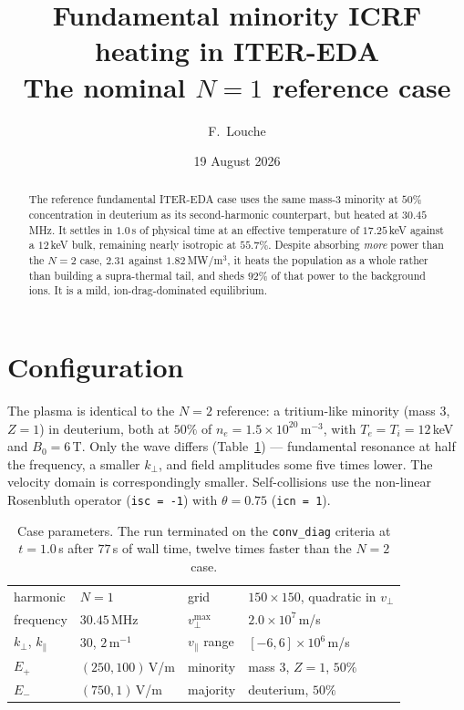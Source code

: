 \documentclass[11pt,a4paper]{article}
\title{\vspace{-1.2cm}\textbf{\large Fundamental minority ICRF heating in ITER-EDA}\\[1mm]
\normalsize The nominal $N{=}1$ reference case}
\author{\normalsize F.~Louche}
\date{\normalsize 19 August 2026}
\newcommand{\code}[1]{\texttt{\small #1}}
\newcommand{\vperp}{v_\perp}
\newcommand{\vpar}{v_\parallel}
\begin{document}
\maketitle
\vspace{-0.9cm}

\begin{abstract}
\noindent\small
The reference fundamental ITER-EDA case uses the same mass-3 minority at $50\%$
concentration in deuterium as its second-harmonic counterpart, but heated at
$30.45\,$MHz. It settles in $1.0\,$s of physical time at an effective
temperature of $17.25\,$keV against a $12\,$keV bulk, remaining nearly
isotropic at $55.7\%$. Despite absorbing \emph{more} power than the $N{=}2$
case, $2.31$ against $1.82\,$MW/m$^3$, it heats the population as a whole
rather than building a supra-thermal tail, and sheds $92\%$ of that power to
the background ions. It is a mild, ion-drag-dominated equilibrium.
\end{abstract}

\vspace{-0.3cm}
\section{Configuration}

The plasma is identical to the $N{=}2$ reference: a tritium-like minority
(mass 3, $Z{=}1$) in deuterium, both at $50\%$ of
$n_e=1.5\times10^{20}\,$m$^{-3}$, with $T_e=T_i=12\,$keV and $B_0=6\,$T. Only
the wave differs (Table~\ref{tab:setup}) --- fundamental resonance at half the
frequency, a smaller $k_\perp$, and field amplitudes some five times lower. The
velocity domain is correspondingly smaller. Self-collisions use the non-linear
Rosenbluth operator (\code{isc = -1}) with $\theta=0.75$ (\code{icn = 1}).

\begin{table}[h]
\centering\small
\caption{Case parameters. The run terminated on the \code{conv\_diag} criteria
at $t=1.0\,$s after $77\,$s of wall time, twelve times faster than the $N{=}2$
case.}
\label{tab:setup}
\begin{tabular}{@{}llll@{}}
\toprule
harmonic & $N=1$ & grid & $150\times150$, quadratic in $\vperp$ \\
frequency & $30.45\,$MHz & $\vperp^{\max}$ & $2.0\times10^{7}\,$m/s \\
$k_\perp$, $k_\parallel$ & $30$, $2\,$m$^{-1}$ & $\vpar$ range & $[-6,6]\times10^{6}\,$m/s \\
$E_+$ & $(250,100)\,$V/m & minority & mass 3, $Z=1$, $50\%$ \\
$E_-$ & $(750,1)\,$V/m & majority & deuterium, $50\%$ \\
\bottomrule
\end{tabular}
\end{table}
\end{document}
